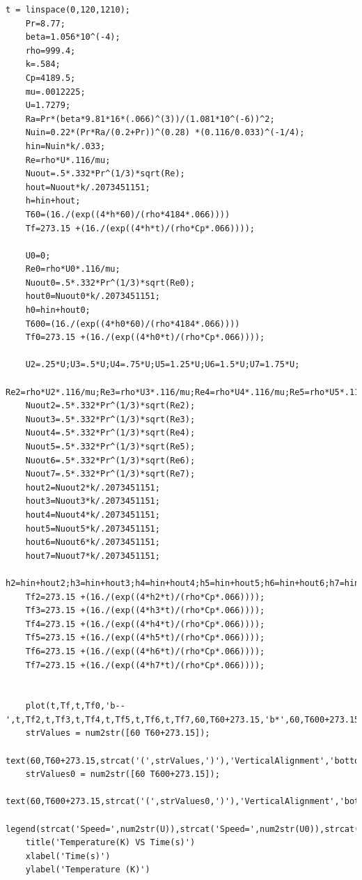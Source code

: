 \documentclass{report}
\begin{document}
	\begin{lstlisting}[style=Matlab-editor]
	t = linspace(0,120,1210);
	Pr=8.77;
	beta=1.056*10^(-4);
	rho=999.4;
	k=.584;
	Cp=4189.5;
	mu=.0012225;
	U=1.7279;
	Ra=Pr*(beta*9.81*16*(.066)^(3))/(1.081*10^(-6))^2;
	Nuin=0.22*(Pr*Ra/(0.2+Pr))^(0.28) *(0.116/0.033)^(-1/4);
	hin=Nuin*k/.033;
	Re=rho*U*.116/mu;
	Nuout=.5*.332*Pr^(1/3)*sqrt(Re);
	hout=Nuout*k/.2073451151;
	h=hin+hout;
	T60=(16./(exp((4*h*60)/(rho*4184*.066))))
	Tf=273.15 +(16./(exp((4*h*t)/(rho*Cp*.066))));
	
	U0=0;
	Re0=rho*U0*.116/mu;
	Nuout0=.5*.332*Pr^(1/3)*sqrt(Re0);
	hout0=Nuout0*k/.2073451151;
	h0=hin+hout0;
	T600=(16./(exp((4*h0*60)/(rho*4184*.066))))
	Tf0=273.15 +(16./(exp((4*h0*t)/(rho*Cp*.066))));
	
	U2=.25*U;U3=.5*U;U4=.75*U;U5=1.25*U;U6=1.5*U;U7=1.75*U;
	Re2=rho*U2*.116/mu;Re3=rho*U3*.116/mu;Re4=rho*U4*.116/mu;Re5=rho*U5*.116/mu;Re6=rho*U6*.116/mu;Re7=rho*U7*.116/mu;
	Nuout2=.5*.332*Pr^(1/3)*sqrt(Re2);
	Nuout3=.5*.332*Pr^(1/3)*sqrt(Re3);
	Nuout4=.5*.332*Pr^(1/3)*sqrt(Re4);
	Nuout5=.5*.332*Pr^(1/3)*sqrt(Re5);
	Nuout6=.5*.332*Pr^(1/3)*sqrt(Re6);
	Nuout7=.5*.332*Pr^(1/3)*sqrt(Re7);
	hout2=Nuout2*k/.2073451151;
	hout3=Nuout3*k/.2073451151;
	hout4=Nuout4*k/.2073451151;
	hout5=Nuout5*k/.2073451151;
	hout6=Nuout6*k/.2073451151;
	hout7=Nuout7*k/.2073451151;
	h2=hin+hout2;h3=hin+hout3;h4=hin+hout4;h5=hin+hout5;h6=hin+hout6;h7=hin+hout7;
	Tf2=273.15 +(16./(exp((4*h2*t)/(rho*Cp*.066))));
	Tf3=273.15 +(16./(exp((4*h3*t)/(rho*Cp*.066))));
	Tf4=273.15 +(16./(exp((4*h4*t)/(rho*Cp*.066))));
	Tf5=273.15 +(16./(exp((4*h5*t)/(rho*Cp*.066))));
	Tf6=273.15 +(16./(exp((4*h6*t)/(rho*Cp*.066))));
	Tf7=273.15 +(16./(exp((4*h7*t)/(rho*Cp*.066))));
	
	
	plot(t,Tf,t,Tf0,'b--',t,Tf2,t,Tf3,t,Tf4,t,Tf5,t,Tf6,t,Tf7,60,T60+273.15,'b*',60,T600+273.15,'b*')
	strValues = num2str([60 T60+273.15]);
	text(60,T60+273.15,strcat('(',strValues,')'),'VerticalAlignment','bottom');
	strValues0 = num2str([60 T600+273.15]);
	text(60,T600+273.15,strcat('(',strValues0,')'),'VerticalAlignment','bottom');
	legend(strcat('Speed=',num2str(U)),strcat('Speed=',num2str(U0)),strcat('Speed=',num2str(U2)),strcat('Speed=',num2str(U3)),strcat('Speed=',num2str(U4)),strcat('Speed=',num2str(U5)),strcat('Speed=',num2str(U6)),strcat('Speed=',num2str(U7)));
	title('Temperature(K) VS Time(s)')
	xlabel('Time(s)')
	ylabel('Temperature (K)')
	\end{lstlisting}
	
	
	{}
	
	
\end{document}
